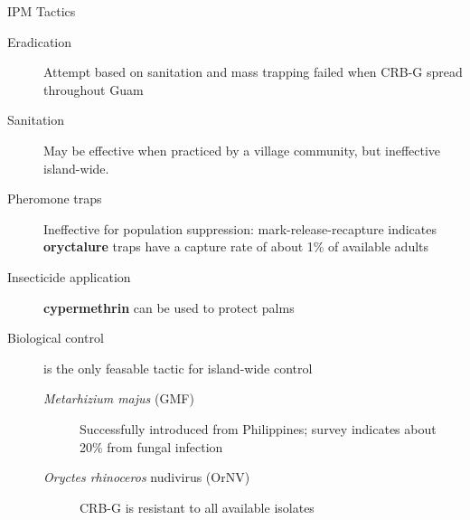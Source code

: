 \documentclass[]{beamer}
\begin{document}
\begin{frame}{IPM Tactics}
	\begin{description}
		\item[Eradication]Attempt based on sanitation and mass trapping failed when CRB-G spread throughout Guam
		\item[Sanitation]May be effective when practiced by a village community, but ineffective island-wide.
		\item[Pheromone traps]Ineffective for population suppression: mark-release-recapture indicates \textbf{oryctalure} traps have a capture rate of about 1\% of available adults
		\item[Insecticide application]\textbf{cypermethrin} can be used to protect palms
		\item[Biological control] is the only feasable tactic for island-wide control
				\begin{description}
					\item[\textit{Metarhizium majus} (GMF)]Successfully introduced from Philippines; survey indicates about 20\% from fungal infection
					\item[\textit{Oryctes rhinoceros} nudivirus (OrNV)]CRB-G is resistant to all available isolates
				\end{description}
				
	\end{description}
\end{frame}


%
%
%

\end{document}
